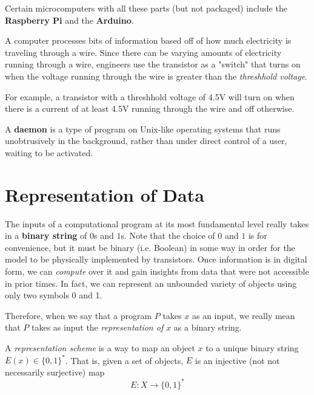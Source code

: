 \documentclass{article}
\begin{document}
  Certain microcomputers with all these parts (but not packaged) include the \textbf{Raspberry Pi} and the \textbf{Arduino}. 

  \begin{definition}
  A computer processes bits of information based off of how much electricity is traveling through a wire. Since there can be varying amounts of electricity running through a wire, engineers use the transistor as a "switch" that turns on when the voltage running through the wire is greater than the \textit{threshhold voltage}. 
  \end{definition}

  For example, a transistor with a threshhold voltage of 4.5V will turn on when there is a current of at least 4.5V running through the wire and off otherwise. 

  \begin{definition}
  A \textbf{daemon} is a type of program on Unix-like operating systems that runs unobtrusively in the background, rather than under direct control of a user, waiting to be activated. 
  \end{definition}

\section{Representation of Data}

  The inputs of a computational program at its most fundamental level really takes in a \textbf{binary string} of $0$s and $1$s. Note that the choice of $0$ and $1$ is for convenience, but it must be binary (i.e. Boolean) in some way in order for the model to be physically implemented by transistors. Once information is in digital form, we can \textit{compute} over it and gain insights from data that were not accessible in prior times. In fact, we can represent an unbounded variety of objects using only two symbols 0 and 1. 

  Therefore, when we say that a program $P$ takes $x$ as an input, we really mean that $P$ takes as input the \textit{representation of $x$} as a binary string.  

  \begin{definition}
  A \textit{representation scheme} is a way to map an object $x$ to a unique binary string $E(x) \in \{0,1\}^*$. That is, given a set of objects, $E$ is an injective (not not necessarily surjective) map
  \[E: X \longrightarrow \{0,1\}^*\]
  \end{definition}
\end{document}
